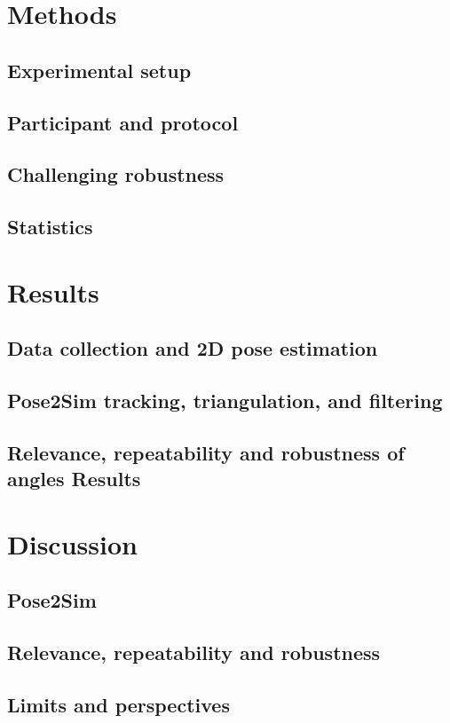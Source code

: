 \section{Methods}
\subsection{Experimental setup}
\blindtext

\subsection{Participant and protocol}
\blindtext

\subsection{Challenging robustness}
\blindtext

\subsection{Statistics}
\blindtext


\section{Results}
\subsection{Data collection and 2D pose estimation}
\blindtext

\subsection{Pose2Sim tracking, triangulation, and filtering}
\blindtext

\subsection{Relevance, repeatability and robustness of angles Results}
\blindtext


\section{Discussion}
\subsection{Pose2Sim}
\blindtext

\subsection{Relevance, repeatability and robustness}
\blindtext

\subsection{Limits and perspectives}
\blindtext
